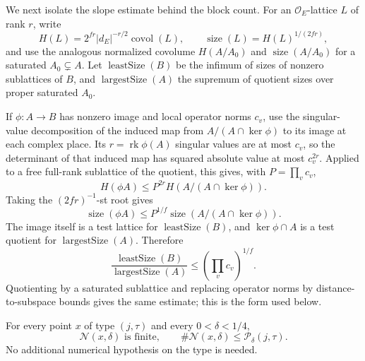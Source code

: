 We next isolate the slope estimate behind the block count. For an $\mathcal O_E$-lattice $L$ of rank $r$, write
\[
 H(L)=2^{fr}|d_E|^{-r/2}\operatorname{covol}(L),\qquad
 \operatorname{size}(L)=H(L)^{1/(2fr)},
\]
and use the analogous normalized covolume $H(A/A_0)$ and $\operatorname{size}(A/A_0)$ for a saturated $A_0\subsetneq A$. Let $\operatorname{leastSize}(B)$ be the infimum of sizes of nonzero sublattices of $B$, and $\operatorname{largestSize}(A)$ the supremum of quotient sizes over proper saturated $A_0$.

If $\phi:A\to B$ has nonzero image and local operator norms $c_v$, use the singular-value decomposition of the induced map from $A/(A\cap\ker\phi)$ to its image at each complex place. Its $r=\operatorname{rk}\phi(A)$ singular values are at most $c_v$, so the determinant of that induced map has squared absolute value at most $c_v^{2r}$. Applied to a free full-rank sublattice of the quotient, this gives, with $P=\prod_vc_v$,
\[
 H(\phi A)\le P^{2r}H(A/(A\cap\ker\phi)).
\]
Taking the $(2fr)^{-1}$-st root gives
\[
 \operatorname{size}(\phi A)\le P^{1/f}\operatorname{size}(A/(A\cap\ker\phi)).
\]
The image itself is a test lattice for $\operatorname{leastSize}(B)$, and $\ker\phi\cap A$ is a test quotient for $\operatorname{largestSize}(A)$. Therefore
\begin{equation}\label{fr:eq:size-inequality}
 \frac{\operatorname{leastSize}(B)}{\operatorname{largestSize}(A)}
 \le\left(\prod_vc_v\right)^{1/f}.
\end{equation}
Quotienting by a saturated sublattice and replacing operator norms by distance-to-subspace bounds gives the same estimate; this is the form used below.

\begin{proposition}\label{fr:prop:near-count}
For every point $x$ of type $(j,\tau)$ and every $0<\delta<1/4$,
\[
 \mathcal N(x,\delta)\text{ is finite},\qquad
 \#\mathcal N(x,\delta)\le\mathcal P_\delta(j,\tau).
\]
No additional numerical hypothesis on the type is needed.
\end{proposition}

